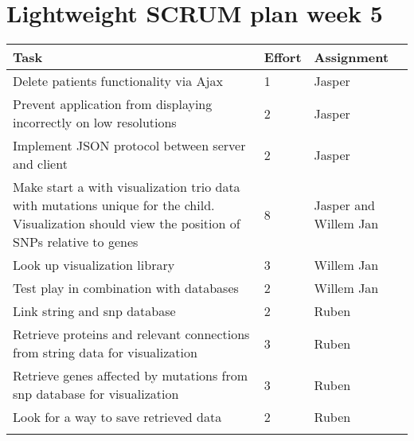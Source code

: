 \documentclass[a4paper]{report}
\begin{document}


\section*{Lightweight SCRUM plan week 5}

\setlength\extrarowheight{5pt}
\begin{table}[ht]
\begin{tabular}{p{8cm}|p{2cm}|p{3cm}}

\textbf{Task} & \textbf{Effort} & \textbf{Assignment}\\
\hline \hline

Delete patients functionality via Ajax & 1 & Jasper\\
Prevent application from displaying incorrectly on low resolutions & 2 & Jasper\\
Implement JSON protocol between server and client & 2 & Jasper\\
Make start a with visualization trio data with mutations unique for the child. Visualization should view the position of SNPs relative to genes & 8 & Jasper and Willem Jan\\
Look up visualization library & 3 & Willem Jan\\
Test play in combination with databases & 2 & Willem Jan\\
Link string and snp database & 2 & Ruben\\
Retrieve proteins and relevant connections from string data for visualization & 3 & Ruben\\
Retrieve genes affected by mutations from snp database for visualization & 3 & Ruben\\
Look for a way to save retrieved data & 2 & Ruben\\

\vspace{10pt} & \vspace{10pt} & \vspace{10pt}\\

\end{tabular}
\end{table}
\end{document}
